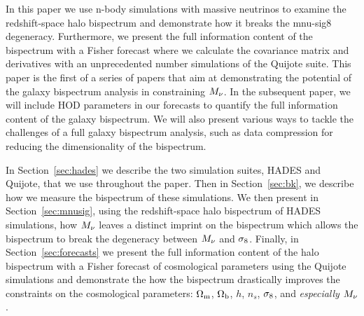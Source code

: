 In this paper we use n-body simulations with massive neutrinos to examine the 
redshift-space halo bispectrum and demonstrate how it breaks the mnu-sig8 degeneracy. 
Furthermore, we present the full information content of the bispectrum with a Fisher 
forecast where we calculate the covariance matrix and derivatives with an unprecedented 
number simulations of the Quijote suite. This paper is the first of a series of 
papers that aim at demonstrating the potential of the galaxy bispectrum analysis in 
constraining $M_\nu$. In the subsequent paper, we will include HOD parameters in our 
forecasts to quantify the full information content of the galaxy bispectrum. We will
also present various ways to tackle the challenges of a full galaxy bispectrum analysis, 
such as data compression for reducing the dimensionality of the bispectrum. 

In Section~\ref{sec:hades} we describe the two simulation suites, HADES and Quijote, 
that we use throughout the paper. Then in Section~\ref{sec:bk}, we describe how 
we measure the bispectrum of these simulations. We then present in Section~\ref{sec:mnusig}, 
using the redshift-space halo bispectrum of HADES simulations, how $M_\nu$ leaves 
a distinct imprint on the bispectrum which allows the bispectrum to break the 
degeneracy between $M_\nu$ and $\sigma_8$. Finally, in Section~\ref{sec:forecasts} 
we present the full information content of the halo bispectrum with a Fisher 
forecast of cosmological parameters using the Quijote simulations and demonstrate 
the how the bispectrum drastically improves the constraints on the cosmological 
parameters: $\Omega_{\rm m}$, $\Omega_{\rm b}$, $h$, $n_s$, $\sigma_8$, and {\em especially} $M_\nu$. 


